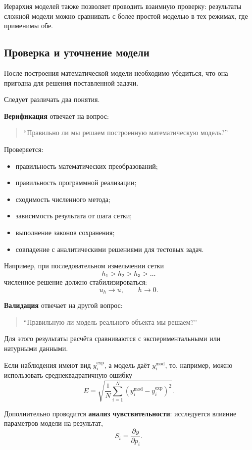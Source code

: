 Иерархия моделей также позволяет проводить взаимную проверку:
результаты сложной модели можно сравнивать с более простой моделью
в тех режимах, где применимы обе.


\subsection{Проверка и уточнение модели}

После построения математической модели необходимо убедиться,
что она пригодна для решения поставленной задачи.

Следует различать два понятия.

\textbf{Верификация} отвечает на вопрос:
\begin{quote}
	``Правильно ли мы решаем построенную математическую модель?''
\end{quote}

Проверяется:
\begin{itemize}
	\item правильность математических преобразований;
	\item правильность программной реализации;
	\item сходимость численного метода;
	\item зависимость результата от шага сетки;
	\item выполнение законов сохранения;
	\item совпадение с аналитическими решениями для тестовых задач.
\end{itemize}

Например, при последовательном измельчении сетки
\[
h_1 > h_2 > h_3 > \ldots
\]
численное решение должно стабилизироваться:
\[
u_{h} \rightarrow u,
\qquad h\rightarrow0.
\]

\textbf{Валидация} отвечает на другой вопрос:
\begin{quote}
	``Правильную ли модель реального объекта мы решаем?''
\end{quote}

Для этого результаты расчёта сравниваются с экспериментальными
или натурными данными.

Если наблюдения имеют вид $y_i^{\text{exp}}$, а модель даёт
$y_i^{\text{mod}}$, то, например, можно использовать среднеквадратичную ошибку
\[
E
=
\sqrt{
	\frac{1}{N}
	\sum_{i=1}^{N}
	\left(
	y_i^{\text{mod}}
	-
	y_i^{\text{exp}}
	\right)^2
}.
\]

Дополнительно проводится \textbf{анализ чувствительности}:
исследуется влияние параметров модели на результат,
\[
S_i
=
\frac{\partial y}{\partial p_i}.
\]

